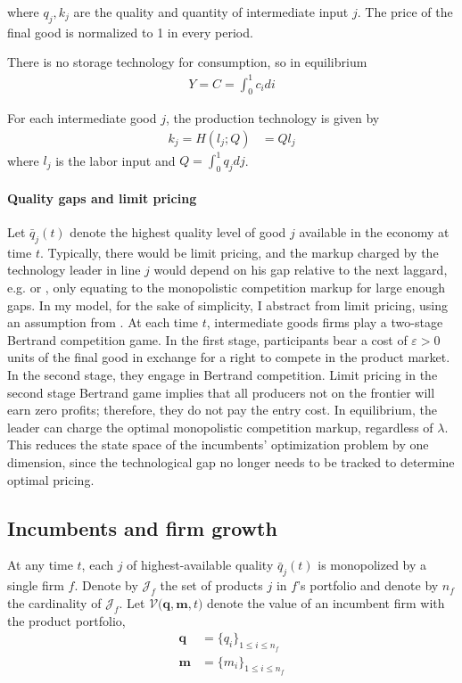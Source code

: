 \documentclass[11pt,english]{article}
\theoremstyle{remark}
\begin{document}
where $q_j,k_j$ are the quality and quantity of intermediate input $j$. The price of the final good is normalized to 1 in every period.

There is no storage technology for consumption, so in equilibrium
\begin{align*}
Y = C = \int_0^1 c_i di
\end{align*}

For each intermediate good $j$, the production technology is given by
\begin{align*}
k_j = H(l_j;Q) &= Q l_j
\end{align*}
where $l_j$ is the labor input and $Q = \int_0^1 q_j dj$. 

\paragraph{Quality gaps and limit pricing} Let $\bar{q}_j(t)$ denote the highest quality level of good $j$ available in the economy at time $t$. Typically, there would be limit pricing, and the markup charged by the technology leader in line $j$ would depend on his gap relative to the next laggard, e.g. \cite{baslandze_spinout_2019} or \cite{aghion_competition_2005}, only equating to the monopolistic competition markup for large enough gaps. In my model, for the sake of simplicity, I abstract from limit pricing, using an assumption from \cite{akcigit_growth_2018}. At each time $t$, intermediate goods firms play a two-stage Bertrand competition game. In the first stage, participants bear a cost of $\varepsilon > 0$ units of the final good in exchange for a right to compete in the product market. In the second stage, they engage in Bertrand competition. Limit pricing in the second stage Bertrand game implies that all producers not on the frontier will earn zero profits; therefore, they do not pay the entry cost. In equilibrium, the leader can charge the optimal monopolistic competition markup, regardless of $\lambda$. This reduces the state space of the incumbents' optimization problem by one dimension, since the technological gap no longer needs to be tracked to determine optimal pricing.

\subsection{Incumbents and firm growth}

At any time $t$, each $j$ of highest-available quality $\bar{q}_j(t)$ is monopolized by a single firm $f$. Denote by $\mathcal{J}_f$ the set of products $j$ in $f$'s portfolio and denote by $n_f$ the cardinality of $\mathcal{J}_f$. Let $\mathcal{V}\Big(\textbf{q},\textbf{m},t\Big)$ denote the value of an incumbent firm with the product portfolio, 
\begin{align*}
\textbf{q} &= \{q_i\}_{1\le i \le n_f} \\
\textbf{m} &= \{m_i\}_{1 \le i \le n_f}
\end{align*} 
\end{document}
